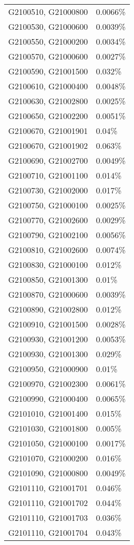 \begin{longtable}[]{@{}ll@{}}
G2100510, G21000800 & 0.0066\% \\
G2100530, G21000600 & 0.0039\% \\
G2100550, G21000200 & 0.0034\% \\
G2100570, G21000600 & 0.0027\% \\
G2100590, G21001500 & 0.032\% \\
G2100610, G21000400 & 0.0048\% \\
G2100630, G21002800 & 0.0025\% \\
G2100650, G21002200 & 0.0051\% \\
G2100670, G21001901 & 0.04\% \\
G2100670, G21001902 & 0.063\% \\
G2100690, G21002700 & 0.0049\% \\
G2100710, G21001100 & 0.014\% \\
G2100730, G21002000 & 0.017\% \\
G2100750, G21000100 & 0.0025\% \\
G2100770, G21002600 & 0.0029\% \\
G2100790, G21002100 & 0.0056\% \\
G2100810, G21002600 & 0.0074\% \\
G2100830, G21000100 & 0.012\% \\
G2100850, G21001300 & 0.01\% \\
G2100870, G21000600 & 0.0039\% \\
G2100890, G21002800 & 0.012\% \\
G2100910, G21001500 & 0.0028\% \\
G2100930, G21001200 & 0.0053\% \\
G2100930, G21001300 & 0.029\% \\
G2100950, G21000900 & 0.01\% \\
G2100970, G21002300 & 0.0061\% \\
G2100990, G21000400 & 0.0065\% \\
G2101010, G21001400 & 0.015\% \\
G2101030, G21001800 & 0.005\% \\
G2101050, G21000100 & 0.0017\% \\
G2101070, G21000200 & 0.016\% \\
G2101090, G21000800 & 0.0049\% \\
G2101110, G21001701 & 0.046\% \\
G2101110, G21001702 & 0.044\% \\
G2101110, G21001703 & 0.036\% \\
G2101110, G21001704 & 0.043\% \\

\end{longtable}
